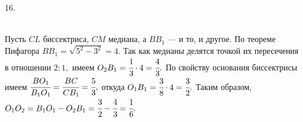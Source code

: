16. \begin{figure}[ht!]
\end{figure}\\
Пусть $CL$ биссектриса, $CM$ медиана, а $BB_1$ --- и то, и другое. По теореме Пифагора $BB_1=\sqrt{5^2-3^2}=4.$ Так как медианы делятся точкой их пересечения в отношении $2:1,$ имеем $O_2B_1=\cfrac{1}{3}\cdot4=\cfrac{4}{3}.$ По свойству основания биссектрисы имеем $\cfrac{BO_1}{B_1O_1}=\cfrac{BC}{CB_1}=\cfrac{5}{3},$ откуда $O_1B_1=\cfrac{3}{8}\cdot4=\cfrac{3}{2}.$ Таким образом, $O_1O_2=B_1O_1-O_2B_1=\cfrac{3}{2}-\cfrac{4}{3}=\cfrac{1}{6}.$\\
